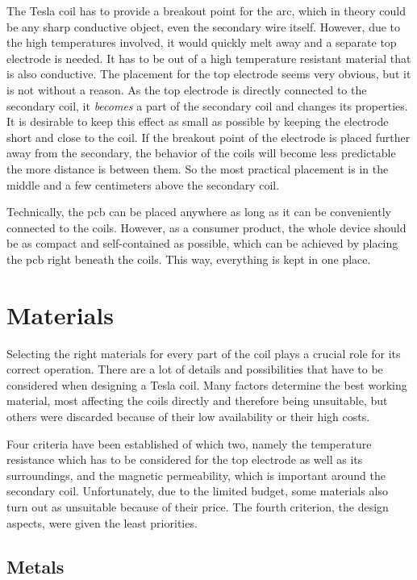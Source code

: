The Tesla coil has to provide a breakout point for the arc, which in theory could be any sharp conductive object, even the secondary wire itself. However, due to the high temperatures involved, it would quickly melt away and a separate top electrode is needed. It has to be out of a high temperature resistant material that is also conductive. The placement for the top electrode seems very obvious, but it is not without a reason. As the top electrode is directly connected to the secondary coil, it \emph{becomes} a part of the secondary coil and changes its properties. It is desirable to keep this effect as small as possible by keeping the electrode short and close to the coil. If the breakout point of the electrode is placed further away from the secondary, the behavior of the coils will become less predictable the more distance is between them. So the most practical placement is in the middle and a few centimeters above the secondary coil.

Technically, the \gls{pcb} can be placed anywhere as long as it can be conveniently connected to the coils. However, as a consumer product, the whole device should be as compact and self-contained as possible, which can be achieved by placing the \gls{pcb} right beneath the coils. This way, everything is kept in one place. 

\section{Materials}

Selecting the right materials for every part of the coil plays a crucial role for its correct operation. There are a lot of details and possibilities that have to be considered when designing a Tesla coil. Many factors determine the best working material, most affecting the coils directly and therefore being unsuitable, but others were discarded because of their low availability or their high costs. 

Four criteria have been established of which two, namely the temperature resistance which has to be considered for the top electrode as well as its surroundings, and the magnetic permeability, which is important around the secondary coil. Unfortunately, due to the limited budget, some materials also turn out as unsuitable because of their price. The fourth criterion, the design aspects, were given the least priorities.

\subsection{Metals}
\label{subsec:materials-metals}

